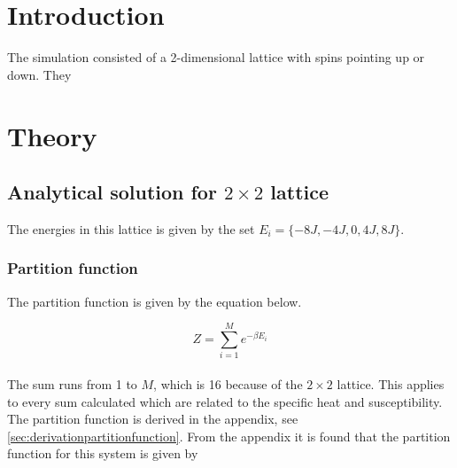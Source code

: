 \documentclass{article}
\begin{document}
\vspace{1cm}

\tableofcontents

\vspace{1cm}

\vspace{1cm}

\section{Introduction} \label{sec:Introduction}

The simulation consisted of a 2-dimensional lattice with spins pointing up or down. They

\vspace{1cm}

\section{Theory} \label{sec:Theory}

\subsection{Analytical solution for \texorpdfstring{ $2 \times 2$ }{text} lattice}

The energies in this lattice is given by the set $E_i = \{- 8 J, -4J, 0 , 4J, 8J \}$.


\subsubsection{Partition function} \label{sec:partitionfunction}

The partition function is given by the equation below.

\begin{equation} \label{eq:partitionfunction}
    Z = \sum_{i=1} ^{M} e^{- \beta E_i}
\end{equation} \\

The sum runs from 1 to $M$, which is 16 because of the $ 2 \times 2 $ lattice. This applies to every sum calculated which are related to the specific heat and susceptibility. \\

The partition function is derived in the appendix, see \ref{sec:derivationpartitionfunction}. From the appendix it is found that the partition function for this system is given by
\end{document}
